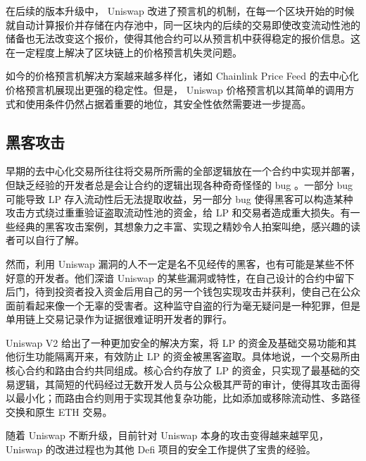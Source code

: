 \documentclass[12pt, a4paper, oneside]{ctexart}
\begin{document}
在后续的版本升级中， Uniswap 改进了预言机的机制，在每一个区块开始的时候就自动计算报价并存储在内存池中，同一区块内的后续的交易即使改变流动性池的储备也无法改变这个报价，使得其他合约可以从预言机中获得稳定的报价信息。这在一定程度上解决了区块链上的价格预言机失灵问题。

如今的价格预言机解决方案越来越多样化，诸如 Chainlink Price Feed 的去中心化价格预言机展现出更强的稳定性。但是， Uniswap 价格预言机以其简单的调用方式和使用条件仍然占据着重要的地位，其安全性依然需要进一步提高。

\subsection{黑客攻击}

早期的去中心化交易所往往将交易所所需的全部逻辑放在一个合约中实现并部署，但缺乏经验的开发者总是会让合约的逻辑出现各种奇奇怪怪的 bug 。一部分 bug 可能导致 LP 存入流动性后无法提取收益，另一部分 bug 使得黑客可以构造某种攻击方式绕过重重验证盗取流动性池的资金，给 LP 和交易者造成重大损失。有一些经典的黑客攻击案例，其想象力之丰富、实现之精妙令人拍案叫绝，感兴趣的读者可以自行了解。

然而，利用 Uniswap 漏洞的人不一定是名不见经传的黑客，也有可能是某些不怀好意的开发者。他们深谙 Uniswap 的某些漏洞或特性，在自己设计的合约中留下后门，待到投资者投入资金后用自己的另一个钱包实现攻击并获利，使自己在公众面前看起来像一个无辜的受害者。这种监守自盗的行为毫无疑问是一种犯罪，但是单用链上交易记录作为证据很难证明开发者的罪行。

Uniswap V2 给出了一种更加安全的解决方案，将 LP 的资金及基础交易功能和其他衍生功能隔离开来，有效防止 LP 的资金被黑客盗取。具体地说，一个交易所由核心合约和路由合约共同组成。核心合约存放了 LP 的资金，只实现了最基础的交易逻辑，其简短的代码经过无数开发人员与公众极其严苛的审计，使得其攻击面得以最小化；而路由合约则用于实现其他复杂功能，比如添加或移除流动性、多路径交换和原生 ETH 交易。

随着 Uniswap 不断升级，目前针对 Uniswap 本身的攻击变得越来越罕见， Uniswap 的改进过程也为其他 Defi 项目的安全工作提供了宝贵的经验。
\end{document}
